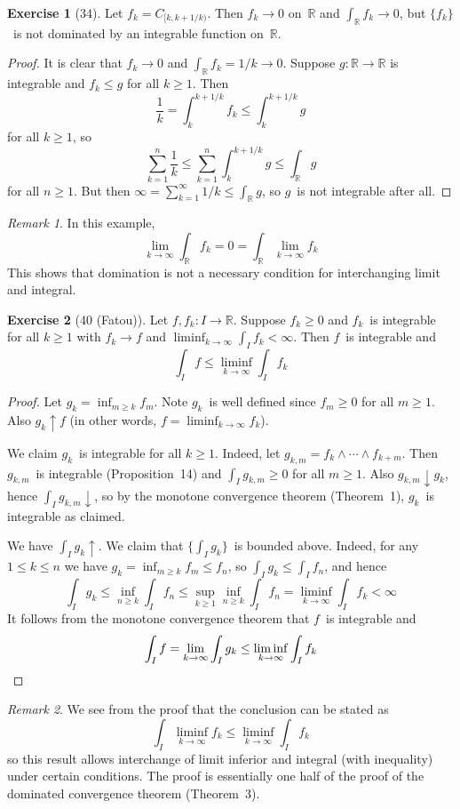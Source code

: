 \documentclass[letterpaper,12pt]{article}
\newcommand{\R}{\mathbb{R}}
\newcommand{\upto}{\uparrow}
\newcommand{\downto}{\downarrow}
\newcommand{\fmin}{\wedge}
\theoremstyle{plain}
\theoremstyle{definition}
\newtheorem*{exer}{Exercise}
\theoremstyle{remark}
\newtheorem*{rmk}{Remark}
\begin{document}
\begin{exer}[34]
Let \(f_k=C_{[k,k+1/k)}\). Then \(f_k\to 0\) on~\(\R\) and \(\int_{\R}f_k\to 0\), but \(\{f_k\}\)~is not dominated by an integrable function on~\(\R\).
\end{exer}
\begin{proof}
It is clear that \(f_k\to 0\) and \(\int_{\R}f_k=1/k\to 0\). Suppose \(g:\R\to\R\) is integrable and \(f_k\le g\) for all \(k\ge 1\). Then
\[\frac{1}{k}=\int_k^{k+1/k}f_k\le\int_k^{k+1/k}g\]
for all \(k\ge 1\), so
\[\sum_{k=1}^n\frac{1}{k}\le\sum_{k=1}^n\int_k^{k+1/k}g\le\int_{\R}g\]
for all \(n\ge 1\). But then \(\infty=\sum_{k=1}^{\infty}1/k\le\int_{\R}g\), so \(g\)~is not integrable after all.
\end{proof}
\begin{rmk}
In this example,
\[\lim_{k\to\infty}\int_{\R}f_k=0=\int_{\R}\lim_{k\to\infty} f_k\]
This shows that domination is not a necessary condition for interchanging limit and integral.
\end{rmk}

\begin{exer}[40 (Fatou)]
Let \(f,f_k:I\to\R\). Suppose \(f_k\ge 0\) and \(f_k\)~is integrable for all \(k\ge 1\) with \(f_k\to f\) and \(\liminf_{k\to\infty}\int_I f_k<\infty\). Then \(f\)~is integrable and
\[\int_I f\le\liminf_{k\to\infty}\int_I f_k\]
\end{exer}
\begin{proof}
Let \(g_k=\inf_{m\ge k}f_m\). Note \(g_k\)~is well defined since \(f_m\ge 0\) for all \(m\ge 1\). Also \(g_k\upto f\) (in other words, \(f=\liminf_{k\to\infty}f_k\)).

We claim \(g_k\)~is integrable for all \(k\ge 1\). Indeed, let \(g_{k,m}=f_k\fmin\cdots\fmin f_{k+m}\). Then \(g_{k,m}\)~is integrable (Proposition~14) and \(\int_I g_{k,m}\ge 0\) for all \(m\ge 1\). Also \(g_{k,m}\downto g_k\), hence \(\int_I g_{k,m}\downto{}\), so by the monotone convergence theorem (Theorem~1), \(g_k\)~is integrable as claimed.

We have \(\int_I g_k\upto{}\). We claim that \(\{\int_I g_k\}\)~is bounded above. Indeed, for any \(1\le k\le n\) we have \(g_k=\inf_{m\ge k}f_m\le f_n\), so \(\int_I g_k\le\int_I f_n\), and hence
\[\int_I g_k\le\inf_{n\ge k}\int_I f_n\le\sup_{k\ge 1}\inf_{n\ge k}\int_I f_n=\liminf_{k\to\infty}\int_I f_k<\infty\]
It follows from the monotone convergence theorem that \(f\)~is integrable and
\[\int_I f=\lim_{k\to\infty}\int_I g_k\le\liminf_{k\to\infty}\int_I f_k\qedhere\]
\end{proof}
\begin{rmk}
We see from the proof that the conclusion can be stated as
\[\int_I\liminf_{k\to\infty}f_k\le\liminf_{k\to\infty}\int_I f_k\]
so this result allows interchange of limit inferior and integral (with inequality) under certain conditions. The proof is essentially one half of the proof of the dominated convergence theorem (Theorem~3).
\end{rmk}
\end{document}
